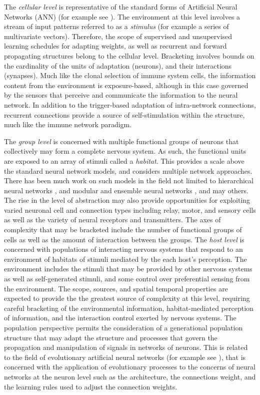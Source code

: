 The \emph{cellular level} is representative of the standard forms of Artificial Neural Networks (ANN) (for example see \cite{Reed1999}). The environment at this level involves a stream of input patterns referred to as a \emph{stimulus} (for example a series of multivariate vectors). Therefore, the scope of supervised and unsupervised learning schedules for adapting weights, as well as recurrent and forward propagating structures belong to the cellular level. 
Bracketing involves bounds on the cardinality of the units of adaptation (neurons), and their interactions (synapses). 
Much like the clonal selection of immune system cells, the information content from the environment is exposure-based, although in this case governed by the sensors that perceive and communicate the information to the neural network. In addition to the trigger-based adaptation of intra-network connections, recurrent connections provide a source of self-stimulation within the structure, much like the immune network paradigm. 

The \emph{group level} is concerned with multiple functional groups of neurons that collectively may form a complete nervous system. As such, the functional units are exposed to an array of stimuli called a \emph{habitat}. This provides a scale above the standard neural network models, and considers multiple network approaches. There has been much work on such models in the field not limited to hierarchical neural networks \cite{Behnke2003}, and modular and ensemble neural networks \cite{Hrycej1992, Sharkey1999}, and may others. The rise in the level of abstraction may also provide opportunities for exploiting varied neuronal cell and connection types including relay, motor, and sensory cells as well as the variety of neural receptors and transmitters. The axes of complexity that may be bracketed include the number of functional groups of cells as well as the amount of interaction between the groups. 
The \emph{host level} is concerned with populations of interacting nervous systems that respond to an environment of habitats of stimuli mediated by the each host's perception. The environment includes the stimuli that may be provided by other nervous systems as well as self-generated stimuli, and some control over preferential sensing from the environment. The scope, sources, and spatial temporal properties are expected to provide the the greatest source of complexity at this level, requiring careful bracketing of the environmental information, habitat-mediated perception of information, and the interaction control exerted by nervous systems. The population perspective permits the consideration of a generational population structure that may adapt the structure and processes that govern the propagation and manipulation of signals in networks of neurons. This is related to the field of evolutionary artificial neural networks (for example see \cite{Yao1993}), that is concerned with the application of evolutionary processes to the concerns of neural networks at the neuron level such as the architecture, the connections weight, and the learning rules used to adjust the connection weights.

